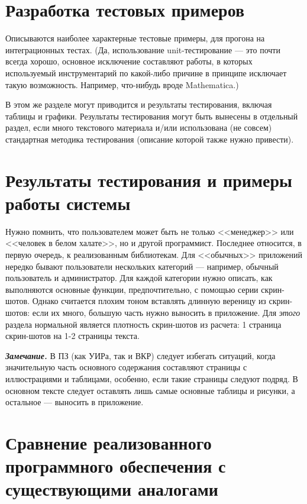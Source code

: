 \section{Разработка тестовых примеров}

Описываются наиболее характерные тестовые примеры, для прогона на интеграционных тестах. (Да, использование unit-тестирование --- это почти всегда хорошо, основное исключение составляют работы, в которых используемый инструментарий по какой-либо причине в принципе исключает такую возможность. Например, что-нибудь вроде Mathematica.)

В этом же разделе могут приводится и результаты тестирования, включая таблицы и
графики. Результаты тестирования могут быть вынесены в отдельный раздел, если
много текстового материала и/или использована (не совсем) стандартная методика
тестирования (описание которой также нужно привести).



\section{Результаты тестирования и примеры работы системы}

Нужно помнить, что пользователем может быть не только <<менеджер>> или <<человек в белом халате>>, но и другой программист. Последнее относится, в первую очередь, к реализованным библиотекам. Для <<обычных>> приложений нередко бывают пользователи нескольких категорий --- например, обычный пользователь и администратор. Для каждой категории нужно описать, как выполняются основные функции, предпочтительно, с помощью серии скрин-шотов. Однако считается плохим тоном вставлять длинную вереницу из скрин-шотов: если их много, большую часть нужно выносить в приложение. Для \textit{этого} раздела нормальной является плотность скрин-шотов из расчета: 1 страница скрин-шотов на 1-2 страницы текста.

\textit{\textbf{Замечание.}} В ПЗ (как УИРа, так и ВКР) следует избегать ситуаций, когда значительную часть основного содержания составляют страницы с иллюстрациями и таблицами, особенно, если такие страницы следуют подряд. В основном тексте следует оставлять лишь самые основные таблицы и рисунки, а остальное --- выносить в приложение.




\section{Сравнение реализованного программного обеспечения с существующими аналогами}

